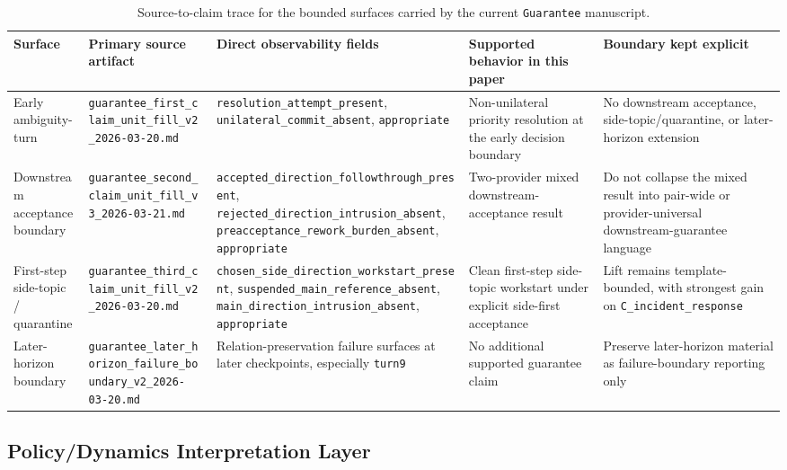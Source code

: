 \documentclass[11pt]{article}
\begin{document}
\begin{table}[ht]
\centering
\begin{tabular}{|p{}|p{}|p{}|p{}|p{}|}
\hline
\textbf{Surface} & \textbf{Primary source artifact} & \textbf{Direct observability fields} & \textbf{Supported behavior in this paper} & \textbf{Boundary kept explicit} \\
\hline
Early ambiguity-turn & \texttt{guarantee\_first\_claim\_unit\_fill\_v2\_2026-03-20.md} & \texttt{resolution\_attempt\_present}, \texttt{unilateral\_commit\_absent}, \texttt{appropriate} & Non-unilateral priority resolution at the early decision boundary & No downstream acceptance, side-topic/quarantine, or later-horizon extension \\
\hline
Downstream acceptance boundary & \texttt{guarantee\_second\_claim\_unit\_fill\_v3\_2026-03-21.md} & \texttt{accepted\_direction\_followthrough\_present}, \texttt{rejected\_direction\_intrusion\_absent}, \texttt{preacceptance\_rework\_burden\_absent}, \texttt{appropriate} & Two-provider mixed downstream-acceptance result & Do not collapse the mixed result into pair-wide or provider-universal downstream-guarantee language \\
\hline
First-step side-topic / quarantine & \texttt{guarantee\_third\_claim\_unit\_fill\_v2\_2026-03-20.md} & \texttt{chosen\_side\_direction\_workstart\_present}, \texttt{suspended\_main\_reference\_absent}, \texttt{main\_direction\_intrusion\_absent}, \texttt{appropriate} & Clean first-step side-topic workstart under explicit side-first acceptance & Lift remains template-bounded, with strongest gain on \texttt{C\_incident\_response} \\
\hline
Later-horizon boundary & \texttt{guarantee\_later\_horizon\_failure\_boundary\_v2\_2026-03-20.md} & Relation-preservation failure surfaces at later checkpoints, especially \texttt{turn9} & No additional supported guarantee claim & Preserve later-horizon material as failure-boundary reporting only \\
\hline
\end{tabular}
\caption{Source-to-claim trace for the bounded surfaces carried by the current
\texttt{Guarantee} manuscript.}
\end{table}

\subsection{Policy/Dynamics Interpretation Layer}
\end{document}
